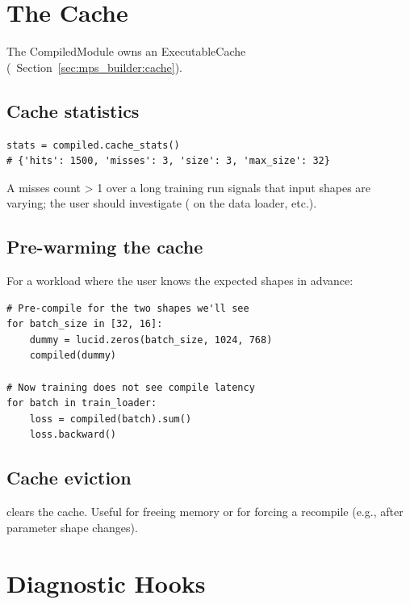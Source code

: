\section{The Cache}
\label{sec:compiled_module:cache}

The CompiledModule owns an ExecutableCache
(~Section~\ref{sec:mps_builder:cache}).

\subsection{Cache statistics}
\label{ssec:compiled_module:cache_stats}

\begin{lstlisting}[style=lucid,language=LucidPython]
stats = compiled.cache_stats()
# {'hits': 1500, 'misses': 3, 'size': 3, 'max_size': 32}
\end{lstlisting}

A misses count > 1 over a long training run signals that input
shapes are varying; the user should investigate
( on the data loader, etc.).

\subsection{Pre-warming the cache}
\label{ssec:compiled_module:prewarming}

For a workload where the user knows the expected shapes in
advance:

\begin{lstlisting}[style=lucid,language=LucidPython]
# Pre-compile for the two shapes we'll see
for batch_size in [32, 16]:
    dummy = lucid.zeros(batch_size, 1024, 768)
    compiled(dummy)

# Now training does not see compile latency
for batch in train_loader:
    loss = compiled(batch).sum()
    loss.backward()
\end{lstlisting}

\subsection{Cache eviction}
\label{ssec:compiled_module:eviction}

 clears the cache. Useful for
freeing memory or for forcing a recompile (e.g., after
parameter shape changes).

\section{Diagnostic Hooks}
\label{sec:compiled_module:diagnostics}

